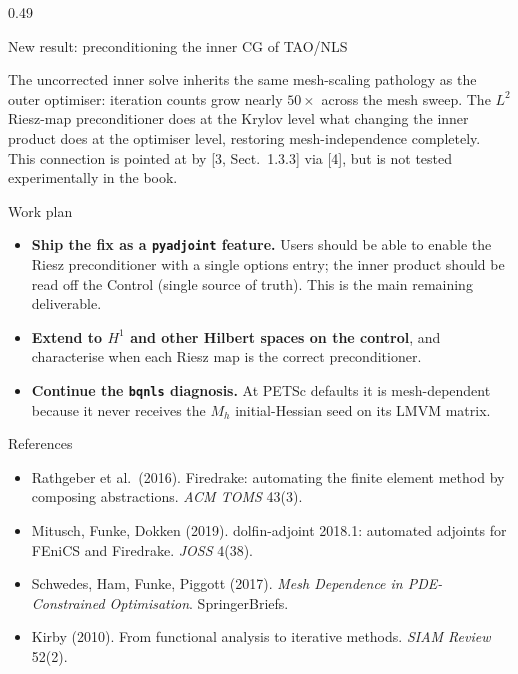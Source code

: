 \documentclass[final]{beamer}
\begin{document}
\begin{frame}[t]
\begin{columns}[t,totalwidth=\dimexpr\paperwidth-3cm\relax]
\begin{column}{0.49\dimexpr\paperwidth-3cm\relax}
\begin{alertblock}{New result: preconditioning the inner CG of TAO/NLS}
\vspace{0.2em}
\raggedright\small
The uncorrected inner solve inherits the same mesh-scaling pathology as the outer optimiser: iteration counts grow nearly $50\times$ across the mesh sweep. The $L^{2}$ Riesz-map preconditioner does at the Krylov level what changing the inner product does at the optimiser level, restoring mesh-independence completely. This connection is pointed at by [3, Sect.~1.3.3] via [4], but is not tested experimentally in the book.
\end{alertblock}

\begin{block}{Work plan}
\begin{itemize}
\item \textbf{Ship the fix as a \texttt{pyadjoint} feature.} Users should be able to enable the Riesz preconditioner with a single options entry; the inner product should be read off the Control (single source of truth). This is the main remaining deliverable.
\item \textbf{Extend to $H^{1}$ and other Hilbert spaces on the control}, and characterise when each Riesz map is the correct preconditioner.
\item \textbf{Continue the \texttt{bqnls} diagnosis.} At PETSc defaults it is mesh-dependent because it never receives the $M_h$ initial-Hessian seed on its LMVM matrix.
\end{itemize}
\end{block}

\begin{block}{References}
\footnotesize
\begin{itemize}\itemsep0.1em
\item[{[1]}] Rathgeber et al.\ (2016). Firedrake: automating the finite element method by composing abstractions. \textit{ACM TOMS} 43(3).
\item[{[2]}] Mitusch, Funke, Dokken (2019). dolfin-adjoint 2018.1: automated adjoints for FEniCS and Firedrake. \textit{JOSS} 4(38).
\item[{[3]}] Schwedes, Ham, Funke, Piggott (2017). \textit{Mesh Dependence in PDE-Constrained Optimisation}. SpringerBriefs.
\item[{[4]}] Kirby (2010). From functional analysis to iterative methods. \textit{SIAM Review} 52(2).
\end{itemize}
\end{block}

\end{column}


\end{columns}
\end{frame}
\end{document}

